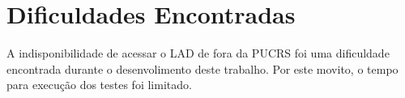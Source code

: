 \section{Dificuldades Encontradas}

A indisponibilidade de acessar o LAD de fora da PUCRS foi uma dificuldade encontrada durante o desenvolimento deste trabalho. Por este movito, o tempo para execução dos testes foi limitado.